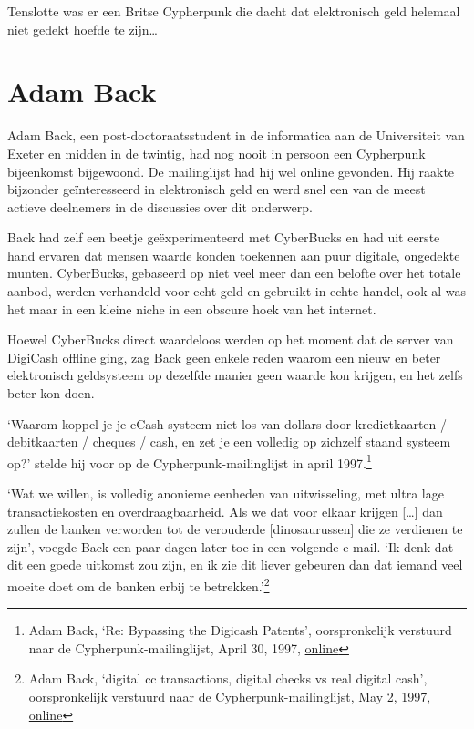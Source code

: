 \documentclass[
  a5paper,
  smalldemyvopaper,11pt,twoside,onecolumn,openright,extrafontsizes,
hidelinks]{memoir}
\begin{document}
Tenslotte was er een Britse Cypherpunk die dacht dat elektronisch geld
helemaal niet gedekt hoefde te zijn\ldots{}

\section{Adam Back}\label{adam-back}

Adam Back, een post-doctoraatsstudent in de informatica aan de
Universiteit van Exeter en midden in de twintig, had nog nooit in
persoon een Cypherpunk bijeenkomst bijgewoond. De mailinglijst had hij
wel online gevonden. Hij raakte bijzonder geïnteresseerd in elektronisch
geld en werd snel een van de meest actieve deelnemers in de discussies
over dit onderwerp.

Back had zelf een beetje geëxperimenteerd met CyberBucks en had uit
eerste hand ervaren dat mensen waarde konden toekennen aan puur
digitale, ongedekte munten. CyberBucks, gebaseerd op niet veel meer dan
een belofte over het totale aanbod, werden verhandeld voor echt geld en
gebruikt in echte handel, ook al was het maar in een kleine niche in een
obscure hoek van het internet.

Hoewel CyberBucks direct waardeloos werden op het moment dat de server
van DigiCash offline ging, zag Back geen enkele reden waarom een nieuw
en beter elektronisch geldsysteem op dezelfde manier geen waarde kon
krijgen, en het zelfs beter kon doen.

`Waarom koppel je je eCash systeem niet los van dollars door
kredietkaarten / debitkaarten / cheques / cash, en zet je een volledig
op zichzelf staand systeem op?' stelde hij voor op de
Cypherpunk-mailinglijst in april 1997.\footnote{Adam Back, `Re:
  Bypassing the Digicash Patents', oorspronkelijk verstuurd naar de
  Cypherpunk-mailinglijst, April 30, 1997,
  \href{https://cypherpunks.venona.com/date/1997/04/msg00822.html}{online}}

`Wat we willen, is volledig anonieme eenheden van uitwisseling, met
ultra lage transactiekosten en overdraagbaarheid. Als we dat voor elkaar
krijgen {[}\ldots{]} dan zullen de banken verworden tot de verouderde
{[}dinosaurussen{]} die ze verdienen te zijn', voegde Back een paar
dagen later toe in een volgende e-mail. `Ik denk dat dit een goede
uitkomst zou zijn, en ik zie dit liever gebeuren dan dat iemand veel
moeite doet om de banken erbij te betrekken.'\footnote{Adam Back,
  `digital cc transactions, digital checks vs real digital cash',
  oorspronkelijk verstuurd naar de Cypherpunk-mailinglijst, May 2, 1997,
  \href{https://cypherpunks.venona.com/date/1997/05/msg00104.html}{online}}
\end{document}
